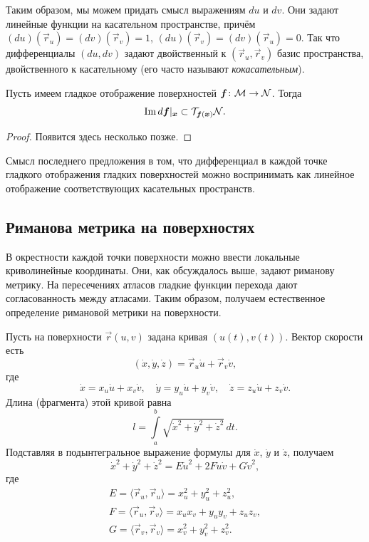Таким образом, мы можем придать смысл выражениям $du$ и $dv$. Они задают линейные функции на касательном пространстве, причём $(du)(\vec{r}_u) = (dv)(\vec{r}_v) = 1$, $(du)(\vec{r}_v) = (dv)(\vec{r}_u) = 0$. Так что дифференциалы $(du, dv)$ задают двойственный к $(\vec{r}_u, \vec{r}_v)$ базис пространства, двойственного к касательному (его часто называют \textit{кокасательным}).

\begin{proposition}
	Пусть имеем гладкое отображение поверхностей $\boldsymbol{f}\colon \mathcal{M} \to \mathcal{N}$. Тогда
	\[
		\operatorname{Im} d\boldsymbol{f}|_{\boldsymbol{x}} \subset \mathcal{T}_{\boldsymbol{f}(\boldsymbol{x})}\mathcal{N}.
	\]
\end{proposition}

\begin{proof} %
	Появится здесь несколько позже.
\end{proof}

Смысл последнего предложения в том, что дифференциал в каждой точке гладкого отображения гладких поверхностей можно воспринимать как линейное отображение соответствующих касательных пространств.

\subsection{Риманова метрика на поверхностях}

В окрестности каждой точки поверхности можно ввести локальные криволинейные координаты. Они, как обсуждалось выше, задают риманову метрику. На пересечениях атласов гладкие функции перехода дают согласованность между атласами. Таким образом, получаем естественное определение римановой метрики на поверхности.

Пусть на поверхности $\vec{r}(u, v)$ задана кривая $(u(t), v(t))$. Вектор скорости есть
\[
	(\dot{x}, \dot{y}, \dot{z}) = \vec{r}_u\dot{u} + \vec{r}_v\dot{v},
\]
где
\[
	\dot{x} = x_u\dot{u} + x_v\dot{v},\quad
	\dot{y} = y_u\dot{u} + y_v\dot{v},\quad
	\dot{z} = z_u\dot{u} + z_v\dot{v}.
\]
Длина (фрагмента) этой кривой равна
\[
	l = \int\limits_a^b\sqrt{\dot{x}^2 + \dot{y}^2 + \dot{z}^2}\,dt.
\]
Подставляя в подынтегральное выражение формулы для $\dot{x}$, $\dot{y}$ и $\dot{z}$, получаем
\[
	\dot{x}^2 + \dot{y}^2 + \dot{z}^2 = E\dot{u}^2 + 2F\dot{u}\dot{v} + G\dot{v}^2,
\]
где
\begin{gather*}
	E = \langle\vec{r}_u, \vec{r}_u\rangle = x_u^2 + y_u^2 + z_u^2,\\
	F = \langle\vec{r}_u, \vec{r}_v\rangle = x_ux_v + y_uy_v + z_uz_v,\\
	G = \langle\vec{r}_v, \vec{r}_v\rangle = x_v^2 + y_v^2 + z_v^2.
\end{gather*}

